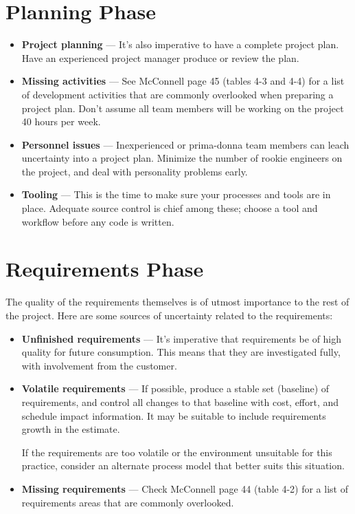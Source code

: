 \documentclass[11pt]{article}
\begin{document}
\section{Planning Phase}
\begin{itemize}
\item {\bf Project planning} --- It's also imperative to have a complete project plan.  Have an
  experienced project manager produce or review the plan.
\item {\bf Missing activities} --- See McConnell page 45 (tables 4-3 and 4-4) for a list of
  development activities that are commonly overlooked when preparing a project plan.  Don't assume
  all team members will be working on the project 40 hours per week.
\item {\bf Personnel issues} --- Inexperienced or prima-donna team members can leach uncertainty into
  a project plan.  Minimize the number of rookie engineers on the project, and deal with personality
  problems early.
\item {\bf Tooling} --- This is the time to make sure your processes and tools are in place.
  Adequate source control is chief among these; choose a tool and workflow before any code is
  written.
\end{itemize}


\section{Requirements Phase}
The quality of the requirements themselves is of utmost importance to the rest of the project.  Here
are some sources of uncertainty related to the requirements:
\begin{itemize}
\item {\bf Unfinished requirements} --- It's imperative that requirements be of high quality for
  future consumption.  This means that they are investigated fully, with involvement from the
  customer.
\item {\bf Volatile requirements} --- If possible, produce a stable set (baseline) of requirements,
  and control all changes to that baseline with cost, effort, and schedule impact information.  It
  may be suitable to include requirements growth in the estimate.

  If the requirements are too volatile or the environment unsuitable for this practice, consider an
  alternate process model that better suits this situation.
\item {\bf Missing requirements} --- Check McConnell page 44 (table 4-2) for a list of requirements
  areas that are commonly overlooked.
  \end{itemize}
\end{document}
